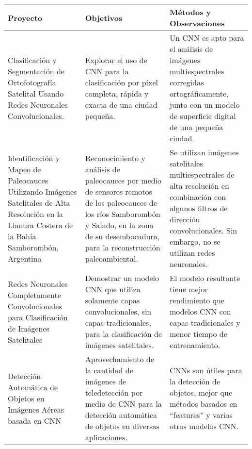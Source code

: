 \begin{center}
    \vspace{-\topsep}
    \begin{table}[h!]
        \small
        \begin{tabular}{|m{4cm}|m{5cm}|m{6.2cm}|}
            \hline
            \bf Proyecto & \bf Objetivos & \bf Métodos y Observaciones \\
            \hline
            Clasificación y Segmentación de Ortofotografía Satelital Usando Redes Neuronales Convolucionales.
            \autocite{langkvist-2016} \hspace{-\textwidth} & Explorar el uso de CNN para la clasificación por píxel
            completa, rápida y exacta de una ciudad pequeña. & Un CNN es apto para el análisis de imágenes
            multiespectrales corregidas ortográficamente, junto con un modelo de superficie digital de una pequeña
            ciudad. \\
            \hline
            Identificación y Mapeo de Paleocauces Utilizando Imágenes Satelitales de Alta Resolución en la Llanura
            Costera de la Bahía Samborombón, Argentina \autocite{luengo-2016} & Reconocimiento y análisis de
            paleocauces por medio de sensores remotos de los paleocauces de los ríos Samborombón y Salado, en la zona
            de su desembocadura, para la reconstrucción paleoambiental. & Se utilizan imágenes satelitales
            multiespectrales de alta resolución en combinación con algunos filtros de dirección convolucionales. Sin
            embargo, no se utilizan redes neuronales. \\
            \hline
            Redes Neuronales Completamente Convolucionales para Clasificación de Imágenes Satelitales
            \autocite{maggiori-2016-1} & Demostrar un modelo CNN que utiliza solamente capas convolucionales, sin capas
            tradicionales, para la clasificación de imágenes satelitales. & El modelo resultante tiene mejor
            rendimiento que modelos CNN con capas tradicionales y menor tiempo de entrenamiento. \\
            \hline
            Detección Automática de Objetos en Imágenes Aéreas basada en CNN \autocite{sevo-2016} & Aprovechamiento de
            la cantidad de imágenes de teledetección por medio de CNN para la detección automática de objetos en
            diversas aplicaciones. & CNNs son útiles para la detección de objetos, mejor que métodos basados en
            \enquote{features} y varios otros modelos CNN. \\

\end{tabular}
\end{table}
\end{center}
